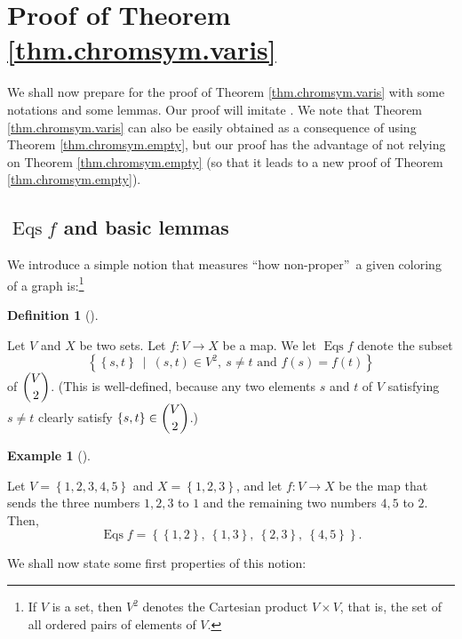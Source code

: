 \documentclass[numbers=enddot,12pt,final,onecolumn,notitlepage]{scrartcl}%
\theoremstyle{definition}
\newtheorem{defi}[theo]{Definition}
\newenvironment{definition}[1][]
{\begin{defi}[#1]\begin{leftbar}}
{\end{leftbar}\end{defi}}
\newtheorem{exmp}[theo]{Example}
\newenvironment{example}[1][]
{\begin{exmp}[#1]\begin{leftbar}}
{\end{leftbar}\end{exmp}}
\begin{document}
\section{\label{sec.first-proofs}Proof of Theorem \ref{thm.chromsym.varis}}

We shall now prepare for the proof of Theorem \ref{thm.chromsym.varis} with
some notations and some lemmas. Our proof will imitate \cite[proof of
Whitney's theorem]{BlaSag86}. We note that Theorem \ref{thm.chromsym.varis}
can also be easily obtained as a consequence of \cite[\S 2 and \S 3.1]%
{DohTri14} using Theorem \ref{thm.chromsym.empty}, but our proof has the
advantage of not relying on Theorem \ref{thm.chromsym.empty} (so that it leads
to a new proof of Theorem \ref{thm.chromsym.empty}).

\subsection{$\operatorname*{Eqs}f$ and basic lemmas}

We introduce a simple notion that measures \textquotedblleft how
non-proper\textquotedblright\ a given coloring of a graph is:\footnote{If $V$
is a set, then $V^{2}$ denotes the Cartesian product $V\times V$, that is, the
set of all ordered pairs of elements of $V$.}

\begin{definition}
\label{def.Eqs}Let $V$ and $X$ be two sets. Let $f:V\rightarrow X$ be a map.
We let $\operatorname*{Eqs}f$ denote the subset%
\[
\left\{  \left\{  s,t\right\}  \ \mid\ \left(  s,t\right)  \in V^{2},\ s\neq
t\text{ and }f\left(  s\right)  =f\left(  t\right)  \right\}
\]
of $\dbinom{V}{2}$. (This is well-defined, because any two elements $s$ and
$t$ of $V$ satisfying $s\neq t$ clearly satisfy $\left\{  s,t\right\}
\in\dbinom{V}{2}$.)
\end{definition}

\begin{example}
Let $V=\left\{  1,2,3,4,5\right\}  $ and $X=\left\{  1,2,3\right\}  $, and let
$f:V\rightarrow X$ be the map that sends the three numbers $1,2,3$ to $1$ and
the remaining two numbers $4,5$ to $2$. Then,%
\[
\operatorname*{Eqs}f=\left\{  \left\{  1,2\right\}  ,\ \left\{  1,3\right\}
,\ \left\{  2,3\right\}  ,\ \left\{  4,5\right\}  \right\}  .
\]

\end{example}

We shall now state some first properties of this notion:
\end{document}
